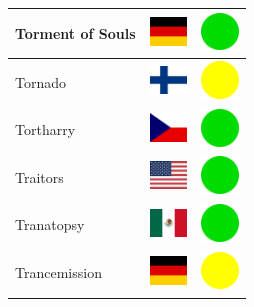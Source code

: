 \documentclass[12pt, a4paper, twoside]{report}
\begin{document}
\begin{center}
\begin{longtable}{|p{5cm}|p{2cm}|p{2cm}|}
Torment of Souls & \includegraphics[width=1cm]{4x3/de} & \includegraphics[width=1cm]{likes/y} \\ \hline
Tornado & \includegraphics[width=1cm]{4x3/fi} & \includegraphics[width=1cm]{likes/m} \\ \hline
Tortharry & \includegraphics[width=1cm]{4x3/cz} & \includegraphics[width=1cm]{likes/y} \\ \hline
Traitors & \includegraphics[width=1cm]{4x3/us} & \includegraphics[width=1cm]{likes/y} \\ \hline
Tranatopsy & \includegraphics[width=1cm]{4x3/mx} & \includegraphics[width=1cm]{likes/y} \\ \hline
Trancemission & \includegraphics[width=1cm]{4x3/de} & \includegraphics[width=1cm]{likes/m} \\ \hline

\end{longtable}
\end{center}
\end{document}

